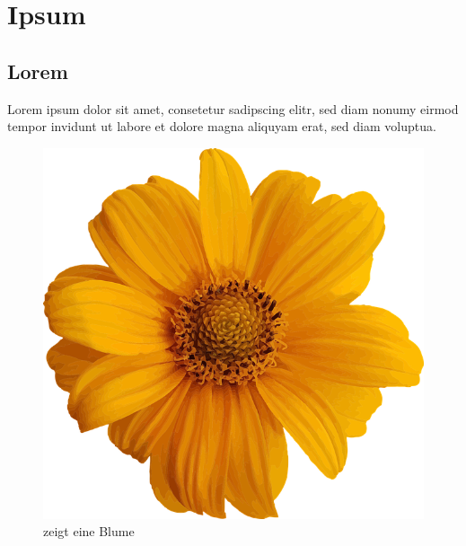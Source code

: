 \chapter{Ipsum} 
\section{Lorem} 
Lorem ipsum dolor sit amet, consetetur sadipscing elitr, sed diam nonumy eirmod tempor invidunt ut labore et dolore magna aliquyam erat, sed diam voluptua. 
\begin{figure}[htb]
	\centering
	\includegraphics[scale=0.2,]{img/sample-logo.png}
	\caption[flower]{zeigt eine Blume}
	\label{fig:imgBlume}
\end{figure}
